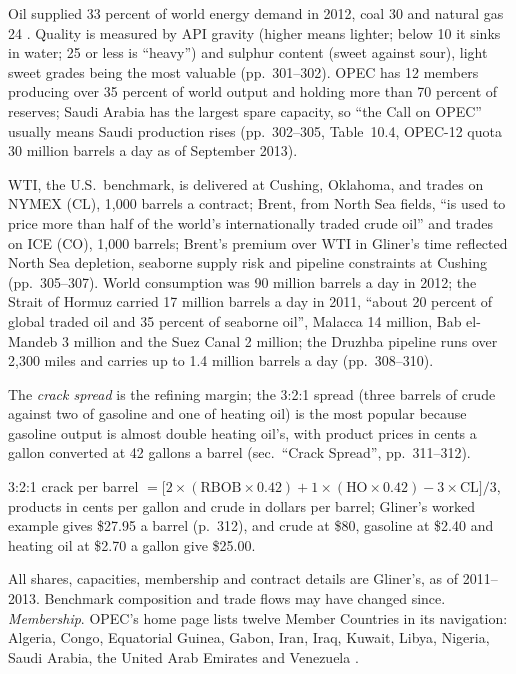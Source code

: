 \begin{qfdefinition}\label{def:crude-oil-markets}
 Oil supplied 33 percent of world energy demand in 2012, coal 30 and natural gas 24 \citep[chap.~10, sec.\ ``Energy'', PDF p.~301]{s7-gliner}. Quality is measured by API gravity (higher means lighter; below 10 it sinks in water; 25 or less is ``heavy'') and sulphur content (sweet against sour), light sweet grades being the most valuable (pp.~301--302). OPEC has 12 members producing over 35 percent of world output and holding more than 70 percent of reserves; Saudi Arabia has the largest spare capacity, so ``the Call on OPEC'' usually means Saudi production rises (pp.~302--305, Table~10.4, OPEC-12 quota 30 million barrels a day as of September 2013).

WTI, the U.S.\ benchmark, is delivered at Cushing, Oklahoma, and trades on NYMEX (CL), 1,000 barrels a contract; Brent, from North Sea fields, ``is used to price more than half of the world's internationally traded crude oil'' and trades on ICE (CO), 1,000 barrels; Brent's premium over WTI in Gliner's time reflected North Sea depletion, seaborne supply risk and pipeline constraints at Cushing (pp.~305--307). World consumption was 90 million barrels a day in 2012; the Strait of Hormuz carried 17 million barrels a day in 2011, ``about 20 percent of global traded oil and 35 percent of seaborne oil'', Malacca 14 million, Bab el-Mandeb 3 million and the Suez Canal 2 million; the Druzhba pipeline runs over 2,300 miles and carries up to 1.4 million barrels a day (pp.~308--310).

The \emph{crack spread} is the refining margin; the 3:2:1 spread (three barrels of crude against two of gasoline and one of heating oil) is the most popular because gasoline output is almost double heating oil's, with product prices in cents a gallon converted at 42 gallons a barrel (sec.\ ``Crack Spread'', pp.~311--312).

 3:2:1 crack per barrel $=\big[2\times(\text{RBOB}\times0.42)+1\times(\text{HO}\times0.42)-3\times\text{CL}\big]/3$, products in cents per gallon and crude in dollars per barrel; Gliner's worked example gives \$27.95 a barrel (p.~312), and crude at \$80, gasoline at \$2.40 and heating oil at \$2.70 a gallon give \$25.00.

 All shares, capacities, membership and contract details are Gliner's, as of 2011--2013. Benchmark composition and trade flows may have changed since. \emph{Membership}. OPEC's home page lists twelve Member Countries in its navigation: Algeria, Congo, Equatorial Guinea, Gabon, Iran, Iraq, Kuwait, Libya, Nigeria, Saudi Arabia, the United Arab Emirates and Venezuela \citep[home page navigation]{opec-home-2026}.


\end{qfdefinition}
